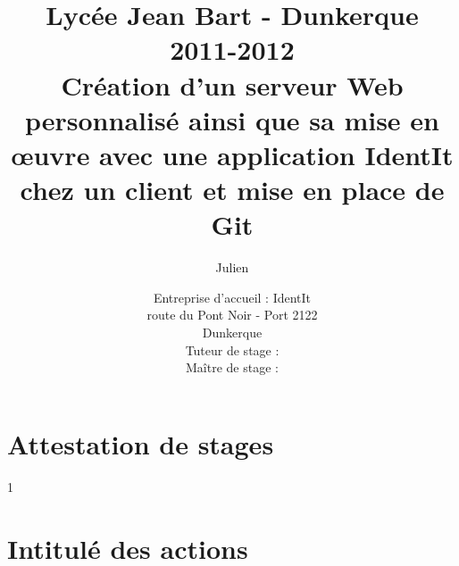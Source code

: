 \documentclass[12pt,a4paper]{report}
\title
{
	\normalsize{Lycée Jean Bart - Dunkerque\\
	2011-2012}\\
	\vspace{15mm}
  \LARGE{Création d'un serveur Web personnalisé ainsi que sa mise en
    \oe{}uvre avec une application IdentIt chez un client et mise en
    place de Git
    \vspace{15mm}}
}
\author{\bsc{Stechele} Julien\\
	\vspace{35mm}
}
\date{
	\normalsize{Entreprise d'accueil : IdentIt\\
    route du Pont Noir - Port 2122\\
  Dunkerque\\
	\vspace{5mm}
  Tuteur de stage : \bsc{M.~Anselin}\\
	Maître de stage : \bsc{M.~Dubourg}
	}
}%
\begin{document}

\maketitle



\renewcommand{\contentsname}{Sommaire}

{\setlength{\baselineskip}{2.3\baselineskip}\tableofcontents\par}













\appendix

\chapter{Attestation de stages} %
\label{cha:Attestations de stages}
1\iere{} \ieme{} \newpage

\chapter{Intitulé des actions} %
\label{cha:Intitulé des actions}
\end{document}
